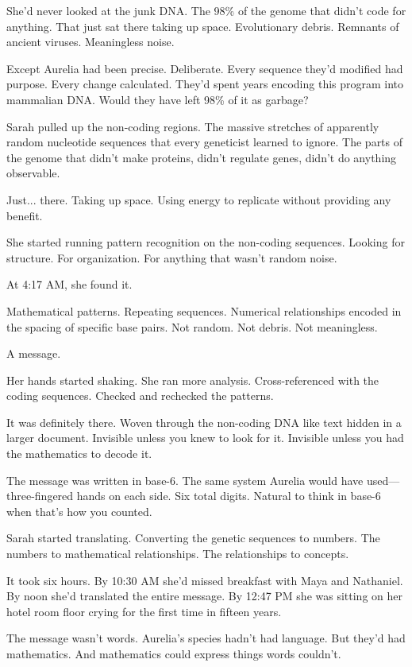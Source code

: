She'd never looked at the junk DNA. The 98\% of the genome that didn't code for anything. That just sat there taking up space. Evolutionary debris. Remnants of ancient viruses. Meaningless noise.

Except Aurelia had been precise. Deliberate. Every sequence they'd modified had purpose. Every change calculated. They'd spent years encoding this program into mammalian DNA. Would they have left 98\% of it as garbage?

Sarah pulled up the non-coding regions. The massive stretches of apparently random nucleotide sequences that every geneticist learned to ignore. The parts of the genome that didn't make proteins, didn't regulate genes, didn't do anything observable.

Just... there. Taking up space. Using energy to replicate without providing any benefit.

She started running pattern recognition on the non-coding sequences. Looking for structure. For organization. For anything that wasn't random noise.

At 4:17 AM, she found it.

Mathematical patterns. Repeating sequences. Numerical relationships encoded in the spacing of specific base pairs. Not random. Not debris. Not meaningless.

A message.

Her hands started shaking. She ran more analysis. Cross-referenced with the coding sequences. Checked and rechecked the patterns.

It was definitely there. Woven through the non-coding DNA like text hidden in a larger document. Invisible unless you knew to look for it. Invisible unless you had the mathematics to decode it.

The message was written in base-6. The same system Aurelia would have used—three-fingered hands on each side. Six total digits. Natural to think in base-6 when that's how you counted.

Sarah started translating. Converting the genetic sequences to numbers. The numbers to mathematical relationships. The relationships to concepts.

It took six hours. By 10:30 AM she'd missed breakfast with Maya and Nathaniel. By noon she'd translated the entire message. By 12:47 PM she was sitting on her hotel room floor crying for the first time in fifteen years.

\scenebreak

The message wasn't words. Aurelia's species hadn't had language. But they'd had mathematics. And mathematics could express things words couldn't.

